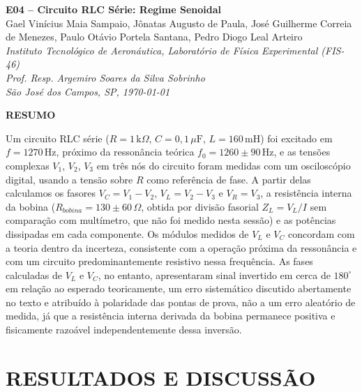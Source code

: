 \documentclass[12pt]{article}
\begin{document}
\doublespacing

\begin{center}
{\fontsize{14}{17}\selectfont\bfseries E04 -- Circuito RLC Série: Regime Senoidal}\\[1em]
{\fontsize{12}{15}\selectfont Gael Vinícius Maia Sampaio, Jônatas Augusto de Paula, José Guilherme Correia de Menezes, Paulo Otávio Portela Santana, Pedro Diogo Leal Arteiro}\\[0.6em]
{\fontsize{10}{12}\selectfont\itshape
Instituto Tecnológico de Aeronáutica, Laboratório de Física Experimental (FIS-46)\\
Prof. Resp. Argemiro Soares da Silva Sobrinho\\
São José dos Campos, SP, \today}
\end{center}

\vspace{1.2em}

\noindent\textbf{RESUMO}

\noindent Um circuito RLC série ($R=1\,\text{k}\Omega$, $C=0{,}1\,\mu\text{F}$, $L=160\,\text{mH}$) foi excitado em $f=1270\,\text{Hz}$, próximo da ressonância teórica $f_0=1260\pm90\,\text{Hz}$, e as tensões complexas $V_1$, $V_2$, $V_3$ em três nós do circuito foram medidas com um osciloscópio digital, usando a tensão sobre $R$ como referência de fase. A partir delas calculamos os fasores $V_C=V_1-V_2$, $V_L=V_2-V_3$ e $V_R=V_3$, a resistência interna da bobina ($R_{bobina}=130\pm60\,\Omega$, obtida por divisão fasorial $Z_L=V_L/I$ sem comparação com multímetro, que não foi medido nesta sessão) e as potências dissipadas em cada componente. Os módulos medidos de $V_L$ e $V_C$ concordam com a teoria dentro da incerteza, consistente com a operação próxima da ressonância e com um circuito predominantemente resistivo nessa frequência. As fases calculadas de $V_L$ e $V_C$, no entanto, apresentaram sinal invertido em cerca de $180^\circ$ em relação ao esperado teoricamente, um erro sistemático discutido abertamente no texto e atribuído à polaridade das pontas de prova, não a um erro aleatório de medida, já que a resistência interna derivada da bobina permanece positiva e fisicamente razoável independentemente dessa inversão.

\section{RESULTADOS E DISCUSSÃO}
\end{document}
